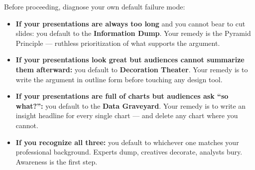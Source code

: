 \begin{lessonbox}
Before proceeding, diagnose your own default failure mode:

\begin{itemize}
  \item \textbf{If your presentations are always too long} and you cannot bear to cut slides: you default to the \textbf{Information Dump}. Your remedy is the Pyramid Principle --- ruthless prioritization of what supports the argument.
  \item \textbf{If your presentations look great but audiences cannot summarize them afterward:} you default to \textbf{Decoration Theater}. Your remedy is to write the argument in outline form before touching any design tool.
  \item \textbf{If your presentations are full of charts but audiences ask ``so what?'':} you default to the \textbf{Data Graveyard}. Your remedy is to write an insight headline for every single chart --- and delete any chart where you cannot.
  \item \textbf{If you recognize all three:} you default to whichever one matches your professional background. Experts dump, creatives decorate, analysts bury. Awareness is the first step.
\end{itemize}
\end{lessonbox}

\clearpage
